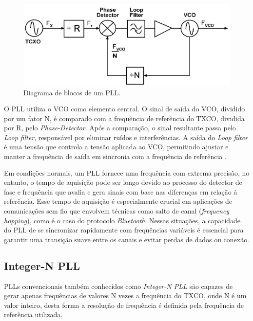 \begin{figure}[h!]
	\caption{Diagrama de blocos de um PLL.}
	\begin{center}
		\includegraphics[scale=0.6]{img/pll_blocos.png}
	\end{center}
	\label{fig:pll_blocks}
\end{figure}

O PLL utiliza o VCO como elemento central. O sinal de saída do VCO, dividido por um fator N, é comparado com a frequência de referência do TXCO, dividida por R, pelo  \textit{Phase-Detector}. Após a comparação, o sinal resultante passa pelo \textit{Loop filter}, responsável por eliminar ruídos e interferências. A saída do \textit{Loop filter} é uma tensão que controla a tensão aplicada ao VCO, permitindo ajustar e manter a frequência de saída em sincronia com a frequência de referência \cite{barrett_1999_fractionalintegern}.

Em condições normais, um PLL fornece uma frequência com extrema precisão, no entanto, o tempo de aquisição pode ser longo devido ao processo do detector de fase e frequência que avalia e gera sinais com base nas diferenças em relação à referência. Esse tempo de aquisição é especialmente crucial em aplicações de comunicações sem fio que envolvem técnicas como salto de canal (\textit{frequency hopping}), como é o caso do protocolo \textit{Bluetooth}. Nessas situações, a capacidade do PLL de se sincronizar rapidamente com frequências variáveis é essencial para garantir uma transição suave entre os canais e evitar perdas de dados ou conexão.
\subsection{Integer-N PLL}

PLLs convencionais também conhecidos como \textit{Integer-N PLL} são capazes de gerar apenas frequências de valores N vezes a frequência do TXCO, onde N é um valor inteiro, desta forma a resolução de frequência é definida pela frequência de referência utilizada. 


